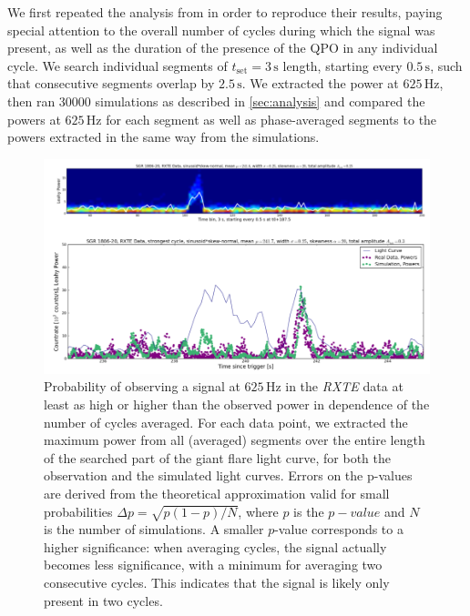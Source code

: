 \documentclass{emulateapj}
\begin{document}
We first repeated the analysis from \citealt{Strohmayer06} in order to reproduce their results, paying special attention to the overall number of cycles during which the signal was present, as well as the duration of the presence of the QPO in any individual cycle.
We search individual segments of $t_{\mathrm{set}} = 3 \, \mathrm{s}$ length, starting every $0.5 \, \mathrm{s}$, such that consecutive segments overlap by $2.5 \, \mathrm{s}$. We extracted the power at $625 \, \mathrm{Hz}$, then ran 30000 simulations as described in \ref{sec:analysis} and compared the powers at $625 \, \mathrm{Hz}$ for each segment as well as phase-averaged segments to the powers extracted in the same way from the simulations.

\begin{figure}[htbp]
\begin{center}
\includegraphics[width=\textwidth]{1806_rxte_lc_combined.png}
\caption{Probability of observing a signal at $625 \, \mathrm{Hz}$ in the {\it RXTE} data at least as high or higher than the observed power in dependence of the number of cycles averaged. For each data point, we extracted the maximum power from all (averaged) segments over the entire length of the searched part of the giant flare light curve, for both the observation and the simulated light curves. Errors on the p-values are derived from the theoretical approximation valid for small probabilities $\Delta p = \sqrt{p (1-p)/N}$, where $p$ is the $p-value$ and $N$ is the number of simulations. A smaller $p$-value corresponds to a higher significance: when averaging cycles, the signal actually becomes less significance, with a minimum for averaging two consecutive cycles. This indicates that the signal is likely only present in two cycles.}
\label{fig:rxte_lc_combined}
\end{center}
\end{figure}
\end{document}
